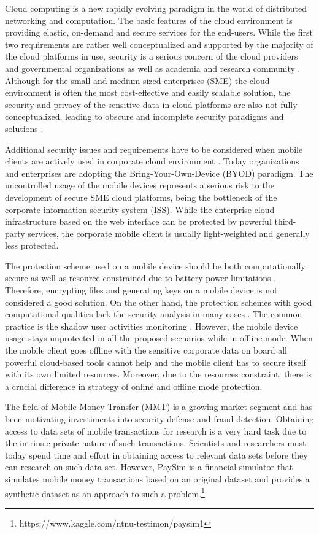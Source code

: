 Cloud computing is a new rapidly evolving paradigm in the world of distributed networking and computation. The basic features of the cloud environment is providing elastic, on-demand and secure services for the end-users. While the first two requirements are rather well conceptualized and supported by the majority of the cloud platforms in use, security is a serious concern of the cloud providers and governmental organizations as well as academia and research community \cite{csa2016,higashi2015,gartner2015}. Although for the small and medium-sized enterprises (SME) the cloud environment is often the most cost-effective and easily scalable solution, the security and privacy of the sensitive data in cloud platforms are also not fully conceptualized, leading to obscure and incomplete security paradigms and solutions \cite{galibus2017offline}.

Additional security issues and requirements have to be considered when mobile clients are actively used in corporate cloud environment \cite{yovel2014}. Today organizations and enterprises are adopting the Bring-Your-Own-Device (BYOD) paradigm. The uncontrolled usage of the mobile devices represents a serious risk to the development of secure SME cloud platforms, being the bottleneck of the corporate information security system (ISS). While the enterprise cloud infrastructure based on the web interface can be protected by powerful third-party services, the corporate mobile client is usually light-weighted and generally less protected. 

The protection scheme used on a mobile device should be both computationally secure as well as resource-constrained due to battery power limitations \cite{khan2015cloud}. Therefore, encrypting files and generating keys on a mobile device is not considered a good solution. On the other hand, the protection schemes with good computational qualities lack the security analysis in many cases \cite{khan2014bss}. The common practice is the shadow user activities monitoring \cite{yovel2014}. However, the mobile device usage stays unprotected in all the proposed scenarios while in offline mode. When the mobile client goes offline with the sensitive corporate data on board all powerful cloud-based tools cannot help and the mobile client has to secure itself with its own limited resources. Moreover, due to the resources constraint, there is a crucial difference in strategy of online and offline mode protection.

The field of Mobile Money Transfer (MMT) is a growing market segment and has been motivating investiments into security defense and fraud detection. Obtaining access to data sets of mobile transactions for research is a very hard task due to the intrinsic private nature of such transactions. Scientists and researchers must today spend time and effort in obtaining access to relevant data sets before they can research on such data set. However, PaySim is a financial simulator that simulates mobile money transactions based on an original dataset and provides a synthetic dataset as an approach to such a problem.\footnote{https://www.kaggle.com/ntnu-testimon/paysim1}

